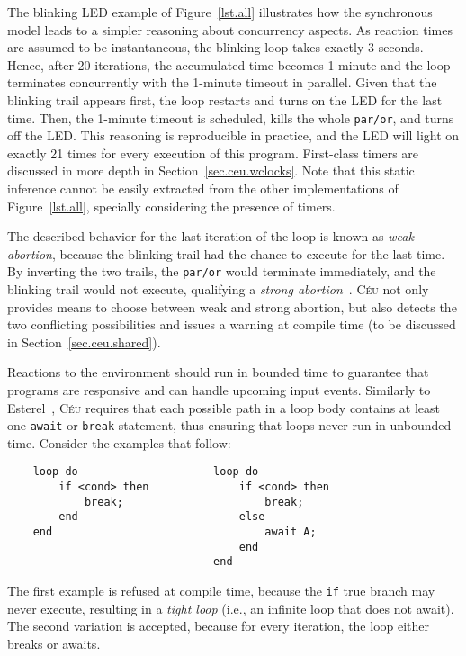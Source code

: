 \documentclass[10pt]{sensys-proc}
\newcommand{\CEU}{\textsc{C\'{e}u}\xspace}
\newcommand{\code}[1] {{\small{\texttt{#1}}}}
\begin{document}
The blinking LED example of Figure~\ref{lst.all} illustrates how the 
synchronous model leads to a simpler reasoning about concurrency aspects.
As reaction times are assumed to be instantaneous, the blinking loop takes 
exactly 3 seconds.
Hence, after 20 iterations, the accumulated time becomes 1 minute and the loop 
terminates concurrently with the 1-minute timeout in parallel.
Given that the blinking trail appears first, the loop restarts and turns on the 
LED for the last time.
Then, the 1-minute timeout is scheduled, kills the whole \code{par/or}, and 
turns off the LED.
%
This reasoning is reproducible in practice, and the LED will light on exactly 
21 times for every execution of this program.
First-class timers are discussed in more depth in 
Section~\ref{sec.ceu.wclocks}.
%
Note that this static inference cannot be easily extracted from the other 
implementations of Figure~\ref{lst.all}, specially considering the presence of 
timers.

The described behavior for the last iteration of the loop is known as 
\emph{weak abortion}, because the blinking trail had the chance to execute for 
the last time.
By inverting the two trails, the \code{par/or} would terminate immediately, and 
the blinking trail would not execute, qualifying a \emph{strong 
abortion}~\cite{esterel.preemption}.
%
\CEU not only provides means to choose between weak and strong abortion, but 
also detects the two conflicting possibilities and issues a warning at compile 
time (to be discussed in Section~\ref{sec.ceu.shared}).

Reactions to the environment should run in bounded time to guarantee that 
programs are responsive and can handle upcoming input events.
Similarly to Esterel~\cite{esterel.ieee91}, \CEU requires that each possible 
path in a loop body contains at least one \code{await} or \code{break} 
statement, thus ensuring that loops never run in unbounded time.
%
Consider the examples that follow:

{\small
\begin{verbatim}
    loop do                     loop do
        if <cond> then              if <cond> then
            break;                      break;
        end                         else
    end                                 await A;
                                    end
                                end
\end{verbatim}
}

The first example is refused at compile time, because the \code{if} true branch 
may never execute, resulting in a \emph{tight loop} (i.e., an infinite loop 
that does not await).
The second variation is accepted, because for every iteration, the loop either 
breaks or awaits.
\end{document}

